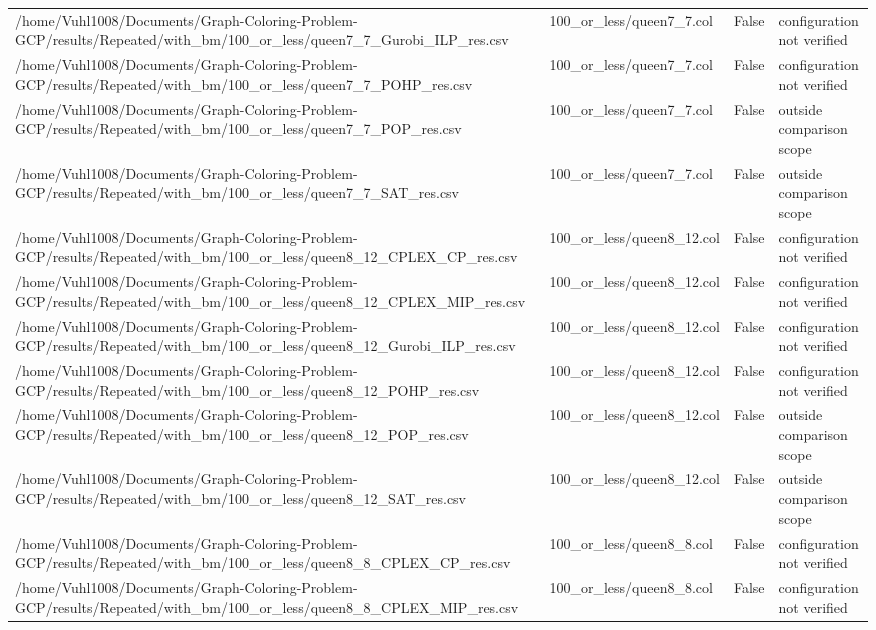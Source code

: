 \begin{table}[htbp]
\begin{tabular}{llll}
/home/Vuhl1008/Documents/Graph-Coloring-Problem-GCP/results/Repeated/with\_bm/100\_or\_less/queen7\_7\_Gurobi\_ILP\_res.csv & 100\_or\_less/queen7\_7.col & False & configuration not verified \\
/home/Vuhl1008/Documents/Graph-Coloring-Problem-GCP/results/Repeated/with\_bm/100\_or\_less/queen7\_7\_POHP\_res.csv & 100\_or\_less/queen7\_7.col & False & configuration not verified \\
/home/Vuhl1008/Documents/Graph-Coloring-Problem-GCP/results/Repeated/with\_bm/100\_or\_less/queen7\_7\_POP\_res.csv & 100\_or\_less/queen7\_7.col & False & outside comparison scope \\
/home/Vuhl1008/Documents/Graph-Coloring-Problem-GCP/results/Repeated/with\_bm/100\_or\_less/queen7\_7\_SAT\_res.csv & 100\_or\_less/queen7\_7.col & False & outside comparison scope \\
/home/Vuhl1008/Documents/Graph-Coloring-Problem-GCP/results/Repeated/with\_bm/100\_or\_less/queen8\_12\_CPLEX\_CP\_res.csv & 100\_or\_less/queen8\_12.col & False & configuration not verified \\
/home/Vuhl1008/Documents/Graph-Coloring-Problem-GCP/results/Repeated/with\_bm/100\_or\_less/queen8\_12\_CPLEX\_MIP\_res.csv & 100\_or\_less/queen8\_12.col & False & configuration not verified \\
/home/Vuhl1008/Documents/Graph-Coloring-Problem-GCP/results/Repeated/with\_bm/100\_or\_less/queen8\_12\_Gurobi\_ILP\_res.csv & 100\_or\_less/queen8\_12.col & False & configuration not verified \\
/home/Vuhl1008/Documents/Graph-Coloring-Problem-GCP/results/Repeated/with\_bm/100\_or\_less/queen8\_12\_POHP\_res.csv & 100\_or\_less/queen8\_12.col & False & configuration not verified \\
/home/Vuhl1008/Documents/Graph-Coloring-Problem-GCP/results/Repeated/with\_bm/100\_or\_less/queen8\_12\_POP\_res.csv & 100\_or\_less/queen8\_12.col & False & outside comparison scope \\
/home/Vuhl1008/Documents/Graph-Coloring-Problem-GCP/results/Repeated/with\_bm/100\_or\_less/queen8\_12\_SAT\_res.csv & 100\_or\_less/queen8\_12.col & False & outside comparison scope \\
/home/Vuhl1008/Documents/Graph-Coloring-Problem-GCP/results/Repeated/with\_bm/100\_or\_less/queen8\_8\_CPLEX\_CP\_res.csv & 100\_or\_less/queen8\_8.col & False & configuration not verified \\
/home/Vuhl1008/Documents/Graph-Coloring-Problem-GCP/results/Repeated/with\_bm/100\_or\_less/queen8\_8\_CPLEX\_MIP\_res.csv & 100\_or\_less/queen8\_8.col & False & configuration not verified \\

\end{tabular}
\end{table}
